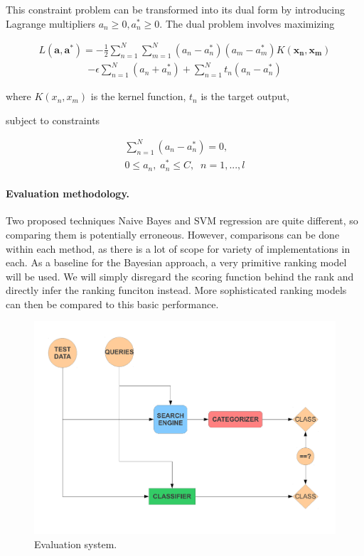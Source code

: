 \documentclass[12pt,twoside,notitlepage]{report}
\begin{document}
This constraint problem can be transformed into its dual form  by introducing
Lagrange multipliers \(a_n \geq 0, a_n^* \geq 0\).  The dual problem involves
maximizing

\begin{gather} L(\mathbf{a},\mathbf{a^*}) =
  -\frac{1}{2}\sum_{n=1}^{N}\sum_{m=1}^{N}(a_n-a_n^*)(a_m-a_m^*)K(\mathbf{x_n},\mathbf{x_m})
\end{gather} \begin{gather*} -\epsilon\sum_{n=1}^{N}(a_n+a_n^*) +
  \sum_{n=1}^{N}t_n(a_n-a_n^*) \end{gather*}

where \(K(x_n,x_m) \) is the kernel function, \(t_n\) is the target output,

subject to constraints

\begin{gather}
  \sum_{n=1}^{N}(a_n-a_n^*)=0,\\
  0\leq a_n,\; a_n^*\leq C,\;\;    n=1,...,l 
\end{gather}


\paragraph{Evaluation methodology.}
Two proposed techniques Naive Bayes and SVM regression are quite different, so
comparing them is potentially erroneous. However, comparisons can be done
within each method, as there is a lot of scope for variety of implementations
in each.
As a baseline for the Bayesian approach, a very primitive ranking model will be
used. We will simply disregard the scoring function behind the rank and
directly infer the ranking funciton instead. More sophisticated ranking models
can then be compared to this basic performance.

\begin{figure}
\centering
\includegraphics[scale=0.5]{figs/eval.pdf}
\caption{Evaluation system. }
\label{eval}
\end{figure}
\end{document}
